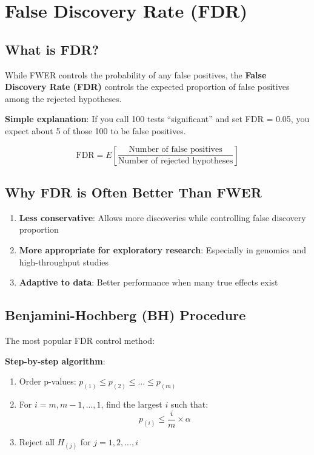 \documentclass[
  11pt,
  letterpaper,
  oneside]{book}
\providecommand{\tightlist}{%
  \setlength{\itemsep}{0pt}\setlength{\parskip}{0pt}}\usepackage{longtable,booktabs,array}
\begin{document}
\section{False Discovery Rate (FDR)}\label{false-discovery-rate-fdr}

\subsection{What is FDR?}\label{what-is-fdr}

While FWER controls the probability of any false positives, the
\textbf{False Discovery Rate (FDR)} controls the expected proportion of
false positives among the rejected hypotheses.

\textbf{Simple explanation}: If you call 100 tests ``significant'' and
set FDR = 0.05, you expect about 5 of those 100 to be false positives.

\[\text{FDR} = E\left[\frac{\text{Number of false positives}}{\text{Number of rejected hypotheses}}\right]\]

\subsection{Why FDR is Often Better Than
FWER}\label{why-fdr-is-often-better-than-fwer}

\begin{enumerate}
\def\labelenumi{\arabic{enumi}.}
\tightlist
\item
  \textbf{Less conservative}: Allows more discoveries while controlling
  false discovery proportion
\item
  \textbf{More appropriate for exploratory research}: Especially in
  genomics and high-throughput studies
\item
  \textbf{Adaptive to data}: Better performance when many true effects
  exist
\end{enumerate}

\subsection{Benjamini-Hochberg (BH)
Procedure}\label{benjamini-hochberg-bh-procedure}

The most popular FDR control method:

\textbf{Step-by-step algorithm}:

\begin{enumerate}
\def\labelenumi{\arabic{enumi}.}
\tightlist
\item
  Order p-values: \(p_{(1)} \leq p_{(2)} \leq ... \leq p_{(m)}\)
\item
  For \(i = m, m-1, ..., 1\), find the largest \(i\) such that:
  \[p_{(i)} \leq \frac{i}{m} \times \alpha\]
\item
  Reject all \(H_{(j)}\) for \(j = 1, 2, ..., i\)
\end{enumerate}
\end{document}
